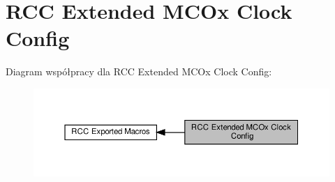\hypertarget{group___r_c_c_ex___m_c_ox___clock___config}{}\section{R\+CC Extended M\+C\+Ox Clock Config}
\label{group___r_c_c_ex___m_c_ox___clock___config}
Diagram współpracy dla R\+CC Extended M\+C\+Ox Clock Config\+:\nopagebreak
\begin{figure}[H]
\begin{center}
\leavevmode
\includegraphics[width=350pt]{group___r_c_c_ex___m_c_ox___clock___config}
\end{center}
\end{figure}
